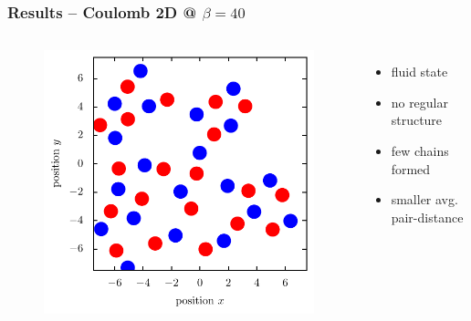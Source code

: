 \documentclass[mathserif,serif]{beamer}
\begin{document}
\begin{frame}
	\frametitle{Results -- Coulomb 2D @ $\beta=40$}
	\centering
	\begin{columns}	
	\begin{figure}
	\includegraphics[width=\textwidth]{../report/figures/Fluid_1_beta_40.pdf}
	\end{figure}
	\begin{itemize}
	\setlength{\itemsep}{1.3em}
	\item fluid state	
	\item no regular structure
	\item few chains formed
	\item smaller avg. pair-distance
	\end{itemize}
\end{columns}
\end{frame}
\end{document}
